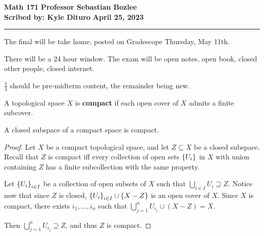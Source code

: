 \documentclass[12pt, twosided]{article}
\begin{document}
\noindent \textbf{Math 171} \hfill \textbf{Professor Sebastian Bozlee} \\
\textbf{Scribed by: Kyle Dituro} \hfill \textbf{April 25, 2023}\hrule
\vspace{.2in}

\begin{framed}
  The final will be take home, posted on Gradescope Thursday, May 11th.

  There will be a 24 hour window. The exam will be open notes, open book, closed other people, closed internet.

  \(\frac{1}{3}\) should be pre-midterm content, the remainder being new.

  
\end{framed}
\begin{df}
  A topological space \(X\) is \textbf{compact} if each open cover of \(X\) admits a finite subcover.
\end{df}

\begin{thm}
  A closed subspace of a compact space is compact.
\end{thm}
\begin{proof}
  Let \(X\) be a compact topological space, and let \(Z \subseteq X\) be a closed subspace. Recall that \(Z\) is compact iff every collection of open sets \(\left\{ U_i \right\}\) in \(X\) with union containing \(Z\) has a finite subcollection with the same property.

  Let \(\left\{ U_i \right\}_{i \in I}\) be a collection of open subsets of \(X\) such that \(\bigcup_{i \in I} U_i \supseteq Z\). Notice now that since \(Z\) is closed, \(\left\{ U_i \right\}_{i \in I} \cup \left\{ X - Z \right\}\)  is an open cover of \(X\). Since \(X\) is compact, there exists \(i_1, \ldots, i_n\) such that \(\bigcup_{j = 1}^n U_{i_j} \cup (X - Z) = X\).

  Then \(\bigcup_{j = 1}^n U_{i_j} \supseteq Z\), and thus \(Z\) is compact.
\end{proof}
\end{document}
